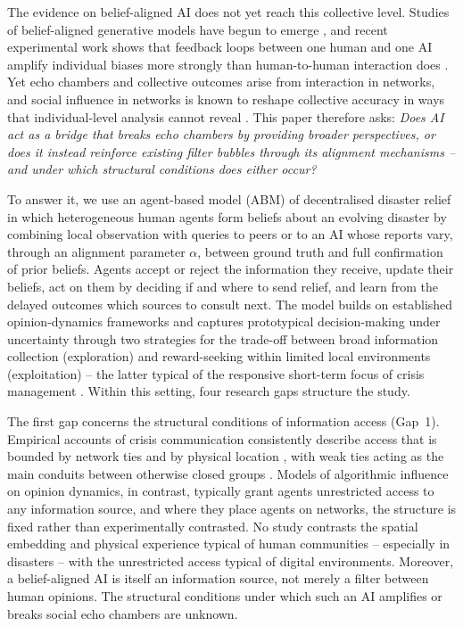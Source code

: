 \documentclass[pdflatex,sn-nature]{sn-jnl}
\begin{document}
The evidence on belief-aligned AI does not yet reach this collective level. Studies of belief-aligned generative models have begun to emerge \citep{sharma2024generative,zhang2024see,cheng2026sycophantic}, and recent experimental work shows that feedback loops between one human and one AI amplify individual biases more strongly than human-to-human interaction does \citep{glickman2024human}. Yet echo chambers and collective outcomes arise from interaction in networks, and social influence in networks is known to reshape collective accuracy in ways that individual-level analysis cannot reveal \citep{lorenz2011social,becker2017network}. This paper therefore asks: \emph{Does AI act as a bridge that breaks echo chambers by providing broader perspectives, or does it instead reinforce existing filter bubbles through its alignment mechanisms -- and under which structural conditions does either occur?}

To answer it, we use an agent-based model (ABM) of decentralised disaster relief in which heterogeneous human agents form beliefs about an evolving disaster by combining local observation with queries to peers or to an AI whose reports vary, through an alignment parameter $\alpha$, between ground truth and full confirmation of prior beliefs. Agents accept or reject the information they receive, update their beliefs, act on them by deciding if and where to send relief, and learn from the delayed outcomes which sources to consult next. The model builds on established opinion-dynamics frameworks \citep{deffuant2000mixing,hegselmann2002opinion} and captures prototypical decision-making under uncertainty through two strategies for the trade-off between broad information collection (exploration) and reward-seeking within limited local environments (exploitation) -- the latter typical of the responsive short-term focus of crisis management \citep{comes2020coordination,march1991exploration}. Within this setting, four research gaps structure the study.

The first gap concerns the structural conditions of information access (Gap~1). Empirical accounts of crisis communication consistently describe access that is bounded by network ties and by physical location \citep{pan2012crisis,holguin2012unique,wolbers2018introducing}, with weak ties acting as the main conduits between otherwise closed groups \citep{granovetter1973strength}. Models of algorithmic influence on opinion dynamics, in contrast, typically grant agents unrestricted access to any information source, and where they place agents on networks, the structure is fixed rather than experimentally contrasted. No study contrasts the spatial embedding and physical experience typical of human communities -- especially in disasters -- with the unrestricted access typical of digital environments. Moreover, a belief-aligned AI is itself an information source, not merely a filter between human opinions. The structural conditions under which such an AI amplifies or breaks social echo chambers are unknown.
\end{document}
